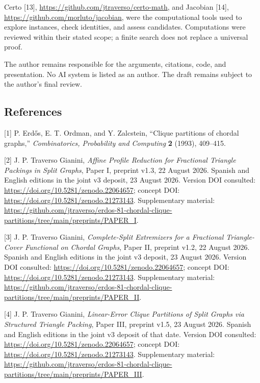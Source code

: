 \documentclass[english,11pt,a4paper]{article}
\begin{document}
Certo {[}13{]}, \url{https://github.com/jtraverso/certo-math}, and Jacobian {[}14{]}, \url{https://github.com/morluto/jacobian}, were the computational tools used to explore instances, check identities, and assess candidates. Computations were reviewed within their stated scope; a finite search does not replace a universal proof.

The author remains responsible for the arguments, citations, code, and presentation. No AI system is listed as an author. The draft remains subject to the author's final review.

\clearpage
\subsection{References}
\begingroup\small\setlength{\parskip}{4pt}\label{references}

{[}1{]} P. Erdős, E. T. Ordman, and Y. Zalcstein, ``Clique partitions of chordal graphs,'' \emph{Combinatorics, Probability and Computing} \textbf{2} (1993), 409--415.

{[}2{]} J. P. Traverso Gianini, \emph{Affine Profile Reduction for Fractional Triangle Packings in Split Graphs}, Paper I, preprint v1.3, 22 August 2026. Spanish and English editions in the joint v3 deposit, 23 August 2026. Version DOI consulted: \url{https://doi.org/10.5281/zenodo.22064657}; concept DOI: \url{https://doi.org/10.5281/zenodo.21273143}. Supplementary material: \url{https://github.com/jtraverso/erdos-81-chordal-clique-partitions/tree/main/preprints/PAPER_I}.

{[}3{]} J. P. Traverso Gianini, \emph{Complete-Split Extremizers for a Fractional Triangle-Cover Functional on Chordal Graphs}, Paper II, preprint v1.2, 22 August 2026. Spanish and English editions in the joint v3 deposit, 23 August 2026. Version DOI consulted: \url{https://doi.org/10.5281/zenodo.22064657}; concept DOI: \url{https://doi.org/10.5281/zenodo.21273143}. Supplementary material: \url{https://github.com/jtraverso/erdos-81-chordal-clique-partitions/tree/main/preprints/PAPER_II}.

{[}4{]} J. P. Traverso Gianini, \emph{Linear-Error Clique Partitions of Split Graphs via Structured Triangle Packing}, Paper III, preprint v1.5, 23 August 2026. Spanish and English editions in the joint v3 deposit of that date. Version DOI consulted: \url{https://doi.org/10.5281/zenodo.22064657}; concept DOI: \url{https://doi.org/10.5281/zenodo.21273143}. Supplementary material: \url{https://github.com/jtraverso/erdos-81-chordal-clique-partitions/tree/main/preprints/PAPER_III}.
\end{document}
